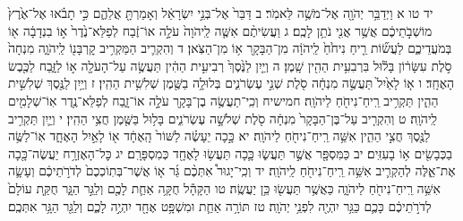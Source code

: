 \documentclass[twoside, openany, parskip=half, 11pt]{book}
\begin{document}
יד טו א וַיְדַבֵּ֥ר יְהֹוָ֖ה אֶל־מֹשֶׁ֥ה לֵּאמֹֽר׃ ב דַּבֵּר֙ אֶל־בְּנֵ֣י יִשְׂרָאֵ֔ל וְאָמַרְתָּ֖ אֲלֵהֶ֑ם כִּ֣י תָבֹ֗אוּ אֶל־אֶ֙רֶץ֙ מוֹשְׁבֹ֣תֵיכֶ֔ם אֲשֶׁ֥ר אֲנִ֖י נֹתֵ֥ן לָכֶֽם׃ ג וַעֲשִׂיתֶ֨ם אִשֶּׁ֤ה לַֽיהֹוָה֙ עֹלָ֣ה אוֹ־זֶ֔בַח לְפַלֵּא־נֶ֙דֶר֙ א֣וֹ בִנְדָבָ֔ה א֖וֹ בְּמֹעֲדֵיכֶ֑ם לַעֲשׂ֞וֹת רֵ֤יחַ נִיחֹ֙חַ֙ לַֽיהֹוָ֔ה מִן־הַבָּקָ֖ר א֥וֹ מִן־הַצֹּֽאן׃ ד וְהִקְרִ֛יב הַמַּקְרִ֥יב קׇרְבָּנ֖וֹ לַֽיהֹוָ֑ה מִנְחָה֙ סֹ֣לֶת עִשָּׂר֔וֹן בָּל֕וּל בִּרְבִעִ֥ית הַהִ֖ין שָֽׁמֶן׃ ה וְיַ֤יִן לַנֶּ֙סֶךְ֙ רְבִיעִ֣ית הַהִ֔ין תַּעֲשֶׂ֥ה עַל־הָעֹלָ֖ה א֣וֹ לַזָּ֑בַח לַכֶּ֖בֶשׂ הָאֶחָֽד׃ ו א֤וֹ לָאַ֙יִל֙ תַּעֲשֶׂ֣ה מִנְחָ֔ה סֹ֖לֶת שְׁנֵ֣י עֶשְׂרֹנִ֑ים בְּלוּלָ֥ה בַשֶּׁ֖מֶן שְׁלִשִׁ֥ית הַהִֽין׃ ז וְיַ֥יִן לַנֶּ֖סֶךְ שְׁלִשִׁ֣ית הַהִ֑ין תַּקְרִ֥יב רֵֽיחַ־נִיחֹ֖חַ לַיהֹוָֽה׃ חמישיח וְכִֽי־תַעֲשֶׂ֥ה בֶן־בָּקָ֖ר עֹלָ֣ה אוֹ־זָ֑בַח לְפַלֵּא־נֶ֥דֶר אֽוֹ־שְׁלָמִ֖ים לַֽיהֹוָֽה׃ ט וְהִקְרִ֤יב עַל־בֶּן־הַבָּקָר֙ מִנְחָ֔ה סֹ֖לֶת שְׁלֹשָׁ֣ה עֶשְׂרֹנִ֑ים בָּל֥וּל בַּשֶּׁ֖מֶן חֲצִ֥י הַהִֽין׃ י וְיַ֛יִן תַּקְרִ֥יב לַנֶּ֖סֶךְ חֲצִ֣י הַהִ֑ין אִשֵּׁ֥ה רֵֽיחַ־נִיחֹ֖חַ לַיהֹוָֽה׃ יא כָּ֣כָה יֵעָשֶׂ֗ה לַשּׁוֹר֙ הָֽאֶחָ֔ד א֖וֹ לָאַ֣יִל הָאֶחָ֑ד אֽוֹ־לַשֶּׂ֥ה בַכְּבָשִׂ֖ים א֥וֹ בָעִזִּֽים׃ יב כַּמִּסְפָּ֖ר אֲשֶׁ֣ר תַּעֲשׂ֑וּ כָּ֛כָה תַּעֲשׂ֥וּ לָאֶחָ֖ד כְּמִסְפָּרָֽם׃ יג כׇּל־הָאֶזְרָ֥ח יַעֲשֶׂה־כָּ֖כָה אֶת־אֵ֑לֶּה לְהַקְרִ֛יב אִשֵּׁ֥ה רֵֽיחַ־נִיחֹ֖חַ לַֽיהֹוָֽה׃ יד וְכִֽי־יָגוּר֩ אִתְּכֶ֨ם גֵּ֜ר א֤וֹ אֲשֶׁר־בְּתֽוֹכְכֶם֙ לְדֹרֹ֣תֵיכֶ֔ם וְעָשָׂ֛ה אִשֵּׁ֥ה רֵֽיחַ־נִיחֹ֖חַ לַיהֹוָ֑ה כַּאֲשֶׁ֥ר תַּעֲשׂ֖וּ כֵּ֥ן יַעֲשֶֽׂה׃ טו הַקָּהָ֕ל חֻקָּ֥ה אַחַ֛ת לָכֶ֖ם וְלַגֵּ֣ר הַגָּ֑ר חֻקַּ֤ת עוֹלָם֙ לְדֹרֹ֣תֵיכֶ֔ם כָּכֶ֛ם כַּגֵּ֥ר יִהְיֶ֖ה לִפְנֵ֥י יְהֹוָֽה׃ טז תּוֹרָ֥ה אַחַ֛ת וּמִשְׁפָּ֥ט אֶחָ֖ד יִהְיֶ֣ה לָכֶ֑ם וְלַגֵּ֖ר הַגָּ֥ר אִתְּכֶֽם׃
\end{document}
